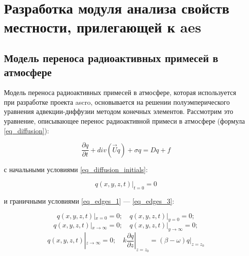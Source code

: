 \chapter{Разработка модуля анализа свойств местности, прилегающей к \ac{aes}}


\section{Модель переноса радиоактивных примесей в атмосфере} 
\label{diffusion_model}

Модель переноса радиоактивных примесей в атмосфере, которая используется при разработке проекта \ac{ascro}, основывается 
на решении полуэмперического уравнения адвекции-диффузии \cite{elokhin} методом конечных элементов. Рассмотрим это 
уравнение, описывающее перенос радиоактивной примеси в атмосфере (формула \ref{eq_diffusion}): 

\begin{equation}
    \label{eq_diffusion}
    \frac{\partial q}{\partial t} + div(\vec{U}q) + \sigma q = Dq + f
\end{equation}

с начальными условиями \ref{eq_diffusion_initials}:

\begin{equation}
	\label{eq_diffusion_initials}
    q(x, y, z, t)|_{t=0} = 0
\end{equation}

и граничными условиями \ref{eq_edges_1} --- \ref{eq_edges_3}:

\begin{equation}
	\label{eq_edges_1}
	q(x, y, z, t)|_{x=0}=0; \,\,\,\,\,\,  q(x, y, z, t)|_{y=0}=0;
\end{equation}
\begin{equation}
	\label{eq_edges_2}
	q(x, y, z, t)|_{x \rightarrow \infty}=0; \,\,\,\,\,\,  q(x, y, z, t)|_{y \rightarrow \infty}=0;
\end{equation}
\begin{equation}
	\label{eq_edges_3}
	q(x, y, z, t)|_{z \rightarrow \infty}=0; \,\,\,\,\,\, 
	k\frac{\partial q}{\partial z}|_{z=z_{0}} = (\beta - \omega)q|_{z=z_{0}}
\end{equation}


